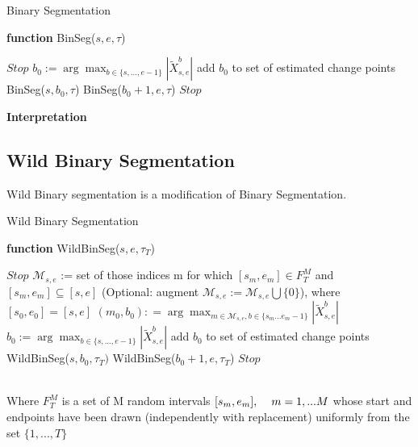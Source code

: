 \documentclass{article}
\newcommand\tab[1][0.4cm]{\hspace*{#1}}
\begin{document}
\begin{algorithm}
\caption{Binary Segmentation}\label{alg:cap}
\textbf{function} BinSeg($s,e,\tau$)
\begin{algorithmic}
        \State $Stop$
    \Else
        \State$b_{0} := \arg \max_{b \in \{s,...,e-1\}} |\tilde{X}_{s,e}^{b}|$
            \State add $b_0$ to set of estimated change points
            \State BinSeg($s,b_{0},\tau$)
            \State BinSeg($b_{0}+1,e,\tau$)
        \Else
            \State $Stop$
            \EndIf
        \EndIf
\end{algorithmic}
\end{algorithm}
\textbf{Interpretation}\\

\clearpage
\subsection{Wild Binary Segmentation}
Wild Binary segmentation is a modification of Binary Segmentation.
\begin{algorithm}
\caption{Wild Binary Segmentation}\label{alg:cap}
\textbf{function} WildBinSeg($s,e,\tau_{T}$)
\begin{algorithmic}
        \State $Stop$
    \Else
        \State $\mathcal{M}_{s,e}$ := set of those indices m for which $[s_{m},e_{m}] \in F^{M}_{T}$ and $[s_{m},e_{m}] \subseteq [s,e]$
        \State (Optional: augment $\mathcal{M}_{s,e}:= \mathcal{M}_{s,e}\bigcup \{0\}$), where $[s_{0},e_{0}] = [s,e]$
        \State $(m_{0},b_{0}): = \arg \max_{m \in \mathcal{M}_{s,e}, b \in \{s_{m}...e_{m}-1\}}|\tilde{X}_{s,e}^{b}|$
        \State$b_{0} := \arg \max_{b\in \{s,...,e-1\}} | \tilde{X}_{s,e}^{b}|$
            \State add $b_0$ to set of estimated change points
            \State WildBinSeg($s,b_{0},\tau_{T})  $
            \State WildBinSeg($b_{0}+1,e,\tau_{T}$)
        \Else
            \State $Stop $
            \EndIf
        \EndIf
\end{algorithmic}
\end{algorithm}
\\
Where $F^{M}_{T}$ is a set of M random intervals $[s_{m},e_{m}],\tab m = 1,...M$ whose start and endpoints have been drawn (independently with replacement) uniformly from the set $\{1, . . . , T \}$
\clearpage
\end{document}
